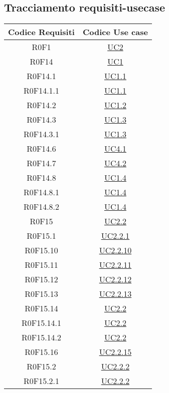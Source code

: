 \documentclass[../AnalisiDeiRequisiti.tex]{subfiles}
\begin{document}
\subsection{Tracciamento requisiti-usecase}
\normalsize
\begin{longtable}{|c|c|}
	\hline
	\textbf{Codice Requisiti} & \textbf{Codice Use case} \\
	\hline
	\endhead
	R0F1 & \hyperlink{UC2}{UC2}\\\hline
	R0F14 & \hyperlink{UC1}{UC1}\\\hline
	R0F14.1 & \hyperlink{UC1.1}{UC1.1}\\\hline
	R0F14.1.1 & \hyperlink{UC1.1}{UC1.1}\\\hline
	R0F14.2 & \hyperlink{UC1.2}{UC1.2}\\\hline
	R0F14.3 & \hyperlink{UC1.3}{UC1.3}\\\hline
	R0F14.3.1 & \hyperlink{UC1.3}{UC1.3}\\\hline
	R0F14.6 & \hyperlink{UC4.1}{UC4.1}\\\hline
	R0F14.7 & \hyperlink{UC4.2}{UC4.2}\\\hline
	R0F14.8 & \hyperlink{UC1.4}{UC1.4}\\\hline
	R0F14.8.1 & \hyperlink{UC1.4}{UC1.4}\\\hline
	R0F14.8.2 & \hyperlink{UC1.4}{UC1.4}\\\hline
	R0F15 & \hyperlink{UC2.2}{UC2.2}\\\hline
	R0F15.1 & \hyperlink{UC2.2.1}{UC2.2.1}\\\hline
	R0F15.10 & \hyperlink{UC2.2.10}{UC2.2.10}\\\hline
	R0F15.11 & \hyperlink{UC2.2.11}{UC2.2.11}\\\hline
	R0F15.12 & \hyperlink{UC2.2.12}{UC2.2.12}\\\hline
	R0F15.13 & \hyperlink{UC2.2.13}{UC2.2.13}\\\hline
	R0F15.14 & \hyperlink{UC2.2}{UC2.2}\\\hline
	R0F15.14.1 & \hyperlink{UC2.2}{UC2.2}\\\hline
	R0F15.14.2 & \hyperlink{UC2.2}{UC2.2}\\\hline
	R0F15.16 & \hyperlink{UC2.2.15}{UC2.2.15}\\\hline
	R0F15.2 & \hyperlink{UC2.2.2}{UC2.2.2}\\\hline
	R0F15.2.1 & \hyperlink{UC2.2.2}{UC2.2.2}\\\hline

\end{longtable}
\end{document}
